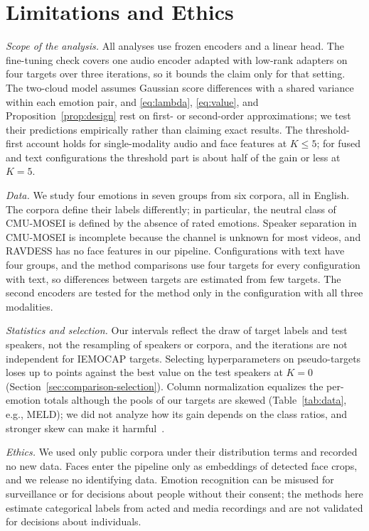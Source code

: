 \section{Limitations and Ethics}
\label{sec:limitations-ethics}

\emph{Scope of the analysis.}
All analyses use frozen encoders and a linear head.
The fine-tuning check covers one audio encoder adapted with low-rank adapters on four targets over three iterations, so it bounds the claim only for that setting.
The two-cloud model assumes Gaussian score differences with a shared variance within each emotion pair, and \eqref{eq:lambda}, \eqref{eq:value}, and Proposition~\ref{prop:design} rest on first- or second-order approximations; we test their predictions empirically rather than claiming exact results.
The threshold-first account holds for single-modality audio and face features at $K \le 5$; for fused and text configurations the threshold part is about half of the gain or less at $K=5$.

\emph{Data.}
We study four emotions in seven groups from six corpora, all in English.
The corpora define their labels differently; in particular, the neutral class of CMU-MOSEI is defined by the absence of rated emotions.
Speaker separation in CMU-MOSEI is incomplete because the channel is unknown for most videos, and RAVDESS has no face features in our pipeline.
Configurations with text have four groups, and the method comparisons use four targets for every configuration with text, so differences between targets are estimated from few targets.
The second encoders are tested for the method only in the configuration with all three modalities.

\emph{Statistics and selection.}
Our intervals reflect the draw of target labels and test speakers, not the resampling of speakers or corpora, and the iterations are not independent for IEMOCAP targets.
Selecting hyperparameters on pseudo-targets loses up to  points against the best value on the test speakers at $K=0$ (Section~\ref{sec:comparison-selection}).
Column normalization equalizes the per-emotion totals although the pools of our targets are skewed (Table~\ref{tab:data}, e.g., MELD); we did not analyze how its gain depends on the class ratios, and stronger skew can make it harmful~\cite{veilleux2021realistic}.

\emph{Ethics.}
We used only public corpora under their distribution terms and recorded no new data.
Faces enter the pipeline only as embeddings of detected face crops, and we release no identifying data.
Emotion recognition can be misused for surveillance or for decisions about people without their consent; the methods here estimate categorical labels from acted and media recordings and are not validated for decisions about individuals.
